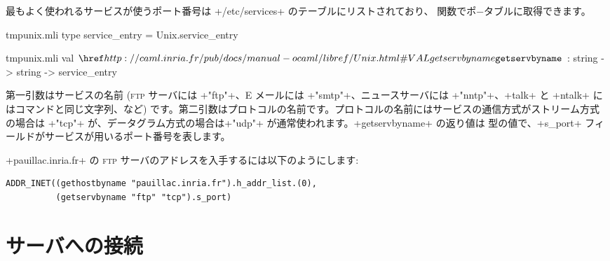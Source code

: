 最もよく使われるサービスが使うポート番号は \ml+/etc/services+ のテーブルにリストされており、 関数でポ−タブルに取得できます。
%
\begin{codefile}{tmpunix.mli}
type service_entry = Unix.service_entry
\end{codefile}
%
\begin{listingcodefile}{tmpunix.mli}
val $\libvalue{Unix}{getservbyname}$ : string -> string -> service_entry
\end{listingcodefile}
%
第一引数はサービスの名前 (\textsc{ftp} サーバには \ml+"ftp"+、E メールには \ml+"smtp"+、ニュースサーバには \ml+"nntp"+、\ml+talk+ と \ml+ntalk+ にはコマンドと同じ文字列、など) です。第二引数はプロトコルの名前です。プロトコルの名前にはサービスの通信方式がストリーム方式の場合は \ml+"tcp"+ が、データグラム方式の場合は\ml+"udp"+ が通常使われます。\ml+getservbyname+ の返り値は  型の値で、\ml+s_port+ フィールドがサービスが用いるポート番号を表します。


\begin{example} %
\ml+pauillac.inria.fr+ の \textsc{ftp} サーバのアドレスを入手するには以下のようにします:
%
\begin{lstlisting}
ADDR_INET((gethostbyname "pauillac.inria.fr").h_addr_list.(0),
          (getservbyname "ftp" "tcp").s_port)
\end{lstlisting}
\end{example}


\section{サーバへの接続}


